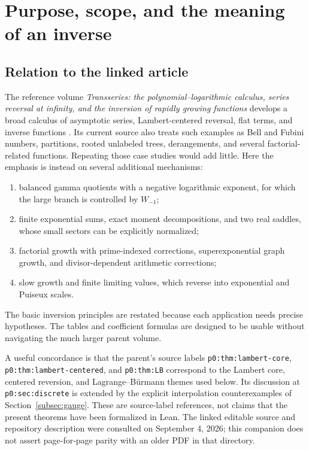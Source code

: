 \documentclass[11pt,a4paper]{article}
\numberwithin{equation}{section}
\theoremstyle{definition}
\theoremstyle{remark}
\begin{document}
\tableofcontents
\newpage

\section{Purpose, scope, and the meaning of an inverse}
\label{sec:scope}

\subsection{Relation to the linked article}

The reference volume \emph{Transseries: the polynomial--logarithmic calculus, series reversal at infinity, and the inversion of rapidly growing functions} develops a broad calculus of asymptotic series, Lambert-centered reversal, flat terms, and inverse functions \cite{base}. Its current source also treats such examples as Bell and Fubini numbers, partitions, rooted unlabeled trees, derangements, and several factorial-related functions. Repeating those case studies would add little. Here the emphasis is instead on several additional mechanisms:
\begin{enumerate}[label=(\roman*),itemsep=2pt]
\item balanced gamma quotients with a negative logarithmic exponent, for which the large branch is controlled by $W_{-1}$;
\item finite exponential sums, exact moment decompositions, and two real saddles, whose small sectors can be explicitly normalized;
\item factorial growth with prime-indexed corrections, superexponential graph growth, and divisor-dependent arithmetic corrections;
\item slow growth and finite limiting values, which reverse into exponential and Puiseux scales.
\end{enumerate}
The basic inversion principles are restated because each application needs precise hypotheses. The tables and coefficient formulas are designed to be usable without navigating the much larger parent volume.

A useful concordance is that the parent's source labels \nolinkurl{p0:thm:lambert-core}, \nolinkurl{p0:thm:lambert-centered}, and \nolinkurl{p0:thm:LB} correspond to the Lambert core, centered reversion, and Lagrange--B\"urmann themes used below. Its discussion at \nolinkurl{p0:sec:discrete} is extended by the explicit interpolation counterexamples of Section~\ref{subsec:gauge}. These are source-label references, not claims that the present theorems have been formalized in Lean. The linked editable source and repository description were consulted on September 4, 2026; this companion does not assert page-for-page parity with an older PDF in that directory.
\end{document}
